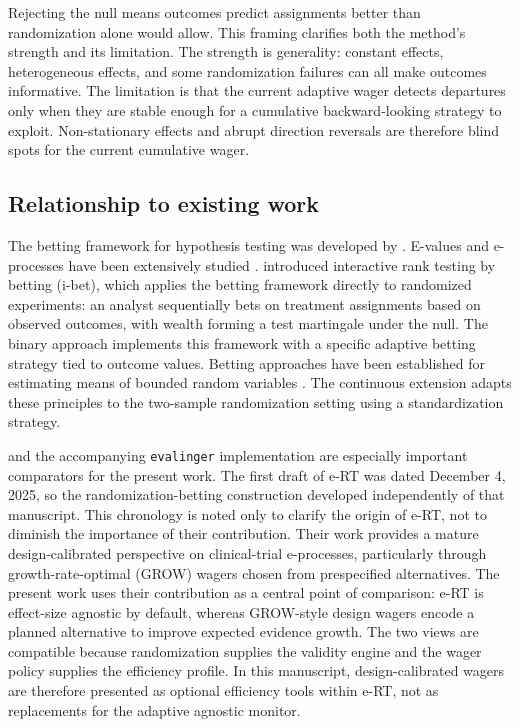 \documentclass[10pt]{article}
\begin{document}
Rejecting the null means outcomes predict assignments better than randomization alone would allow. This framing clarifies both the method's strength and its limitation. The strength is generality: constant effects, heterogeneous effects, and some randomization failures can all make outcomes informative. The limitation is that the current adaptive wager detects departures only when they are stable enough for a cumulative backward-looking strategy to exploit. Non-stationary effects and abrupt direction reversals are therefore blind spots for the current cumulative wager.

\subsection{Relationship to existing work}

The betting framework for hypothesis testing was developed by \citet{shafer2021}. E-values and e-processes have been extensively studied \citep{vovk2021, ramdas2022, ramdas2025}. \citet{pmlr-v177-duan22a} introduced interactive rank testing by betting (i-bet), which applies the betting framework directly to randomized experiments: an analyst sequentially bets on treatment assignments based on observed outcomes, with wealth forming a test martingale under the null. The binary approach implements this framework with a specific adaptive betting strategy tied to outcome values. Betting approaches have been established for estimating means of bounded random variables \citep{waudbysmith2023estimating}. The continuous extension adapts these principles to the two-sample randomization setting using a standardization strategy.

\citet{sokolova2026evalues} and the accompanying \texttt{evalinger} implementation \citep{evalinger2026} are especially important comparators for the present work. The first draft of e-RT was dated December 4, 2025, so the randomization-betting construction developed independently of that manuscript. This chronology is noted only to clarify the origin of e-RT, not to diminish the importance of their contribution. Their work provides a mature design-calibrated perspective on clinical-trial e-processes, particularly through growth-rate-optimal (GROW) wagers chosen from prespecified alternatives. The present work uses their contribution as a central point of comparison: e-RT is effect-size agnostic by default, whereas GROW-style design wagers encode a planned alternative to improve expected evidence growth. The two views are compatible because randomization supplies the validity engine and the wager policy supplies the efficiency profile. In this manuscript, design-calibrated wagers are therefore presented as optional efficiency tools within e-RT, not as replacements for the adaptive agnostic monitor.
\end{document}
